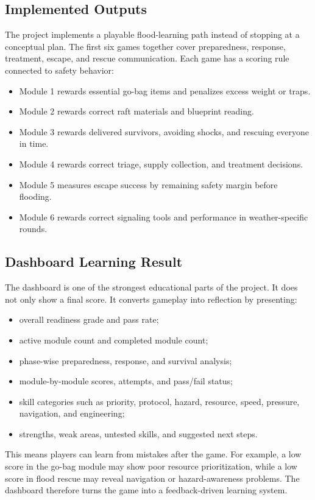 \documentclass[11pt,a4paper]{article}
\begin{document}
\subsection{Implemented Outputs}
The project implements a playable flood-learning path instead of stopping at a conceptual plan. The first six games together cover preparedness, response, treatment, escape, and rescue communication. Each game has a scoring rule connected to safety behavior:
\begin{itemize}
  \item Module 1 rewards essential go-bag items and penalizes excess weight or traps.
  \item Module 2 rewards correct raft materials and blueprint reading.
  \item Module 3 rewards delivered survivors, avoiding shocks, and rescuing everyone in time.
  \item Module 4 rewards correct triage, supply collection, and treatment decisions.
  \item Module 5 measures escape success by remaining safety margin before flooding.
  \item Module 6 rewards correct signaling tools and performance in weather-specific rounds.
\end{itemize}

\subsection{Dashboard Learning Result}
The dashboard is one of the strongest educational parts of the project. It does not only show a final score. It converts gameplay into reflection by presenting:
\begin{itemize}
  \item overall readiness grade and pass rate;
  \item active module count and completed module count;
  \item phase-wise preparedness, response, and survival analysis;
  \item module-by-module scores, attempts, and pass/fail status;
  \item skill categories such as priority, protocol, hazard, resource, speed, pressure, navigation, and engineering;
  \item strengths, weak areas, untested skills, and suggested next steps.
\end{itemize}
This means players can learn from mistakes after the game. For example, a low score in the go-bag module may show poor resource prioritization, while a low score in flood rescue may reveal navigation or hazard-awareness problems. The dashboard therefore turns the game into a feedback-driven learning system.
\end{document}
